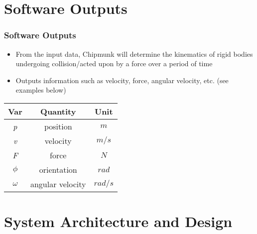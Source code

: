 \documentclass{beamer}
\begin{document}

\section[Outputs]{Software Outputs}


\begin{frame}

\frametitle{Software Outputs}

\begin{itemize}
	\item From the input data, Chipmunk will determine the kinematics of rigid bodies undergoing collision/acted upon by a force over a period of time
	\item Outputs information such as velocity, force, angular velocity, etc. (see examples below)
\end{itemize}

\begin{center}
	\begin{tabular}{|| c | c | c ||}
		\hline
		Var & Quantity & Unit \\
		\hline\hline
		\textit{p} & position & $m$ \\ %
		\textit{v} & velocity & $m/s$ \\
		\textit{F} & force & $N$ \\
		\textit{$\phi$} & orientation & $rad$ \\
		\textit{$\omega$} & angular velocity & $rad/s$ \\
		\hline
	\end{tabular}
\end{center}

\end{frame}


\section[Design]{System Architecture and Design}

\end{document}

